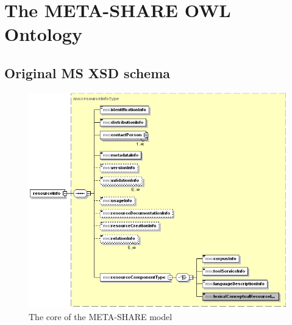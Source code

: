 \documentclass{llncs}
\begin{document}
\section{The META-SHARE OWL Ontology}
\label{sec:ontology}
\subsection{Original MS XSD schema}
\label{sec:xsd}

\begin{figure}
    \centering
    \includegraphics[width=.8\textwidth]{figure_resource.png}
    \caption{\label{fig:resource}The core of the META-SHARE model}
\end{figure}
\end{document}
